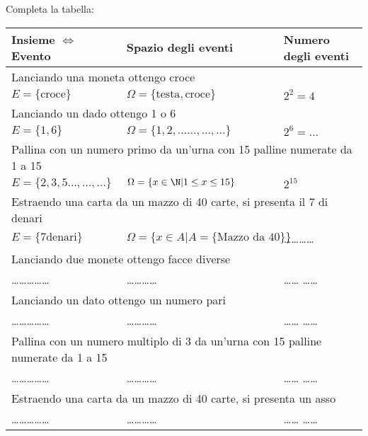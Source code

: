 \begin{esercizio}
 \label{ese:9.3}
Completa la tabella:
\begin{center}
\begin{tabular}{lll}
Insieme \(\Leftrightarrow\) Evento & Spazio degli eventi & Numero degli eventi\\
\midrule
\multicolumn{3}{l}{Lanciando una moneta ottengo croce}\\
\( E=\{\text{croce}\} \) & \( \Omega =\{\text{testa},\text{croce}\} \) & \( 2^2=4 \)\\
\midrule
\multicolumn{3}{l}{Lanciando un dado ottengo 1 o 6} \\
\( E=\{1,6\} \) & \( \Omega =\{1,2,\ldots \ldots, \ldots, \ldots\} \) & \( 2^6=\ldots 
\)\\
\midrule
\multicolumn{3}{l}{Pallina con un numero primo da un'urna con 15 palline 
numerate da 1 a 15}\\
\( E=\{2,3,5\ldots,\ldots,\ldots\} \) & \( \Omega =\{x\in \N| 1\le x\le 15\} 
\) & 
\( 2^{15} \)\\
\midrule
\multicolumn{3}{l}{Estraendo una carta da un mazzo di 40 carte, si presenta il 7 
di denari}\\
\( E=\{7\text{denari}\} \) & \( \Omega =\{x\in A| A=\{\text{Mazzo da 40}\}\} \) & 
\ldots\ldots\ldots\ldots\\
\midrule
\multicolumn{3}{l}{Lanciando due monete ottengo facce diverse}\\
\ldots \ldots \ldots \ldots \ldots & \ldots \ldots \ldots \ldots & \ldots \ldots 
\ldots \ldots\\
\midrule
\multicolumn{3}{l}{Lanciando un dato ottengo un numero pari}\\
\ldots \ldots \ldots \ldots \ldots & \ldots \ldots \ldots \ldots & \ldots \ldots 
\ldots \ldots\\
\midrule
\multicolumn{3}{l}{Pallina con un numero multiplo di 3 da un'urna con 15 palline 
numerate da 1 a 15}\\
\ldots \ldots \ldots \ldots \ldots & \ldots \ldots \ldots \ldots & \ldots \ldots 
\ldots \ldots\\
\midrule
\multicolumn{3}{l}{Estraendo una carta da un mazzo di 40 carte, si presenta un 
asso}\\
\ldots \ldots \ldots \ldots \ldots & \ldots \ldots \ldots \ldots & \ldots \ldots 
\ldots \ldots\\
\end{tabular}
\end{center}
\end{esercizio}



